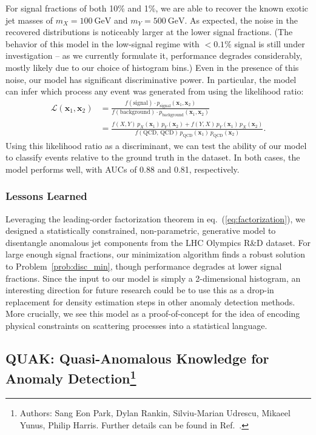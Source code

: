 \documentclass[a4paper,11pt]{article}
\newcommand{\bbm}[1]{\mathbf{#1}}
\newcommand{\bv}[1]{\bbm{#1}}
\DeclareRobustCommand{\Eq}[1]{eq.~(\ref{#1})}
\begin{document}
For signal fractions of both 10\% and 1\%, we are able to recover the known exotic jet masses of $m_X = 100~\text{GeV}$ and $m_Y = 500~\text{GeV}$.
As expected, the noise in the recovered distributions is noticeably larger at the lower signal fractions.
(The behavior of this model in the low-signal regime with $<0.1\%$ signal is still under investigation -- as we currently formulate it, performance degrades considerably, mostly likely due to our choice of histogram bins.)
Even in the presence of this noise, our model has significant discriminative power.
In particular, the model can infer which process any event was generated from using the likelihood ratio:
\begin{align}
\mathcal{L}(\bv{x}_1, \bv{x}_2) 
&= \frac{f(\text{signal}) \cdot p_\text{signal}(\bv{x}_1, \bv{x}_2)}{f(\text{background}) \cdot p_\text{background}(\bv{x}_1, \bv{x}_2)}\\
&= \frac{f(X, Y) \,p_X(\bv{x}_1) \, p_Y(\bv{x}_2) + f(Y, X) \, p_Y(\bv{x}_1) \, p_X(\bv{x}_2)}{f(\text{QCD, QCD})  \, p_\text{QCD}(\bv{x}_1) \, p_\text{QCD}(\bv{x}_2)}.
\end{align}
Using this likelihood ratio as a discriminant, we can test the ability of our model to classify events relative to the ground truth in the dataset.
In both cases, the model performs well, with AUCs of 0.88 and 0.81, respectively.


\subsubsection{Lessons Learned}
\label{sec:lessons}

Leveraging the leading-order factorization theorem in \Eq{eq:factorization}, we designed a statistically constrained, non-parametric, generative model to disentangle anomalous jet components from the LHC Olympics R\&D dataset.
For large enough signal fractions, our minimization algorithm finds a robust solution to Problem~\ref{prob:disc_min}, though performance degrades at lower signal fractions.
Since the input to our model is simply a 2-dimensional histogram, an interesting direction for future research could be to use this as a drop-in replacement for density estimation steps in other anomaly detection methods. 
More crucially, we see this model as a proof-of-concept for the idea of encoding physical constraints on scattering processes into a statistical language.


 \FloatBarrier


\subsection[QUAK: Quasi-Anomalous Knowledge for Anomaly Detection]{QUAK: Quasi-Anomalous Knowledge for Anomaly Detection\footnote{Authors: Sang Eon Park, Dylan Rankin, Silviu-Marian Udrescu, Mikaeel Yunus, Philip Harris.  Further details can be found in Ref.~\cite{Park:2020pak}.}}
\end{document}
